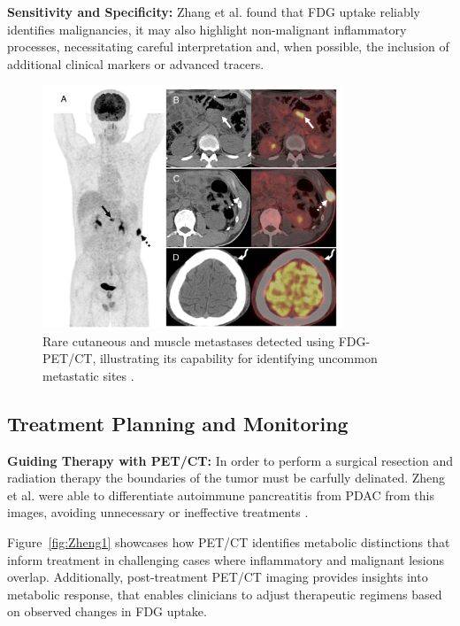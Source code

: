 \documentclass[11pt]{article} %
\begin{document}
\textbf{Sensitivity and Specificity:} Zhang et al. found that FDG uptake reliably identifies malignancies, it may also highlight non-malignant inflammatory processes, necessitating careful interpretation and, when possible, the inclusion of additional clinical markers or advanced tracers.

\begin{figure}[H]
    \centering
    \includegraphics[width=0.8\textwidth]{assets/Zhang1.png}
    \caption{Rare cutaneous and muscle metastases detected using FDG-PET/CT, illustrating its capability for identifying uncommon metastatic sites \cite{Zhang2023}.}
    \label{fig:Zhang1}
\end{figure}


\subsection{Treatment Planning and Monitoring}

\textbf{Guiding Therapy with PET/CT:} In order to perform a surgical resection and radiation therapy the boundaries of the tumor must be carfully delinated. Zheng et al. were able to differentiate autoimmune pancreatitis from PDAC from this images, avoiding unnecessary or ineffective treatments \cite{Zheng2018}.

Figure~\ref{fig:Zheng1} showcases how PET/CT identifies metabolic distinctions that inform treatment in challenging cases where inflammatory and malignant lesions overlap. Additionally, post-treatment PET/CT imaging provides insights into metabolic response, that enables clinicians to adjust therapeutic regimens based on observed changes in FDG uptake.
\end{document}
